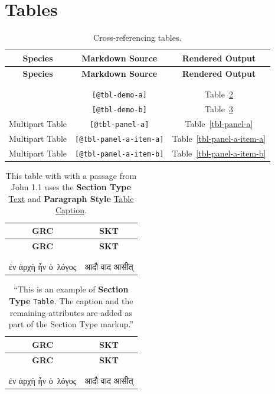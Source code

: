 \documentclass[
  10pt,
  oneside,
  cleardoublepage=empty,
  numbers=noenddot,
  titlepage,
  toclink=all,
  toc=bibliography,
  headinclude,
  footinclude]{scrbook}
\newcommand{\skt}[1]{\foreignlanguage{sanskrit}{\selectfont\sanskritfont #1}}
\theoremstyle{plain}
\theoremstyle{plain}
\theoremstyle{definition}
\theoremstyle{definition}
\theoremstyle{plain}
\theoremstyle{plain}
\theoremstyle{definition}
\theoremstyle{plain}
\theoremstyle{remark}
\begin{document}
\section{Tables}\label{tables}

\begin{longtable}[]{@{}ccc@{}}
\toprule\noalign{}
\textbf{Species} & \textbf{Markdown Source} & \textbf{Rendered
Output} \\
\midrule\noalign{}
\endfirsthead
\toprule\noalign{}
\textbf{Species} & \textbf{Markdown Source} & \textbf{Rendered
Output} \\
\midrule\noalign{}
\endhead
\bottomrule\noalign{}
\tabularnewline
\caption{Cross-referencing tables.}\label{tbl-tables}\tabularnewline
\endlastfoot
& \texttt{{[}@tbl-demo-a{]}} &
\label{cite_58}{\label{cite_58}Table~\ref{tbl-demo-a}} \\
& \texttt{{[}@tbl-demo-b{]}} &
\label{cite_59}{\label{cite_59}Table~\ref{tbl-demo-b}} \\
Multipart Table & \texttt{{[}@tbl-panel-a{]}} &
\label{cite_60}{\label{cite_60}Table~\ref{tbl-panel-a}} \\
Multipart Table & \texttt{{[}@tbl-panel-a-item-a{]}} &
\label{cite_61}{\label{cite_61}Table~\ref{tbl-panel-a-item-a}} \\
Multipart Table & \texttt{{[}@tbl-panel-a-item-b{]}} &
\label{cite_62}{\label{cite_62}Table~\ref{tbl-panel-a-item-b}} \\
\end{longtable}

\begin{longtable}[]{@{}cc@{}}
\toprule\noalign{}
\textbf{GRC} & \textbf{SKT} \\
\midrule\noalign{}
\endfirsthead
\toprule\noalign{}
\textbf{GRC} & \textbf{SKT} \\
\midrule\noalign{}
\endhead
\bottomrule\noalign{}
\tabularnewline
\caption{This table with with a passage from John 1.1 uses the
\textbf{Section Type} \ul{Text} and \textbf{Paragraph Style} \ul{Table
Caption}.}\label{tbl-demo-a}\tabularnewline
\endlastfoot
\foreignlanguage{ancientgreek}{ἐν ἀρχὴ ἦν ὁ~λόγος} &
\skt{आदौ वाद आसीत्} \\
\end{longtable}

\begin{longtable}[]{@{}cc@{}}
\toprule\noalign{}
\textbf{GRC} & \textbf{SKT} \\
\midrule\noalign{}
\endfirsthead
\toprule\noalign{}
\textbf{GRC} & \textbf{SKT} \\
\midrule\noalign{}
\endhead
\bottomrule\noalign{}
\tabularnewline
\caption{\enquote{This is an example of \textbf{Section Type}
\texttt{Table}. The caption and the remaining attributes are added as
part of the Section Type markup.}}\label{tbl-demo-b}\tabularnewline
\endlastfoot
\foreignlanguage{ancientgreek}{ἐν ἀρχὴ ἦν ὁ~λόγος} &
\skt{आदौ वाद आसीत्} \\
\end{longtable}
\end{document}
